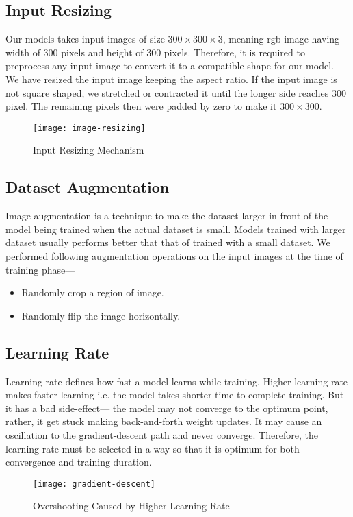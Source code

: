         \subsection{Input Resizing}
            Our models takes input images of size $300\times 300\times 3$, meaning \acrshort{rgb} image having width of 300 pixels and height of 300 pixels. Therefore, it is required to preprocess any input image to convert it to a compatible shape for our model.
            We have resized the input image keeping the aspect ratio. If the input image is not square shaped, we stretched or contracted it until the longer side reaches 300 pixel. The remaining pixels then were padded by zero to make it $300\times 300$. 
            \begin{figure}[h]
                \centering
                \texttt{[image: image-resizing]}
                \caption{Input Resizing Mechanism}
                \label{fig:img_resize}
            \end{figure}          
            
        \subsection{Dataset Augmentation}
            Image augmentation is a technique to make the dataset larger in front of the model being trained when the actual dataset is small. Models trained with larger dataset usually performs better that that of trained with a small dataset.            
            We performed following augmentation operations on the input images at the time of training phase---
            
            \begin{itemize}
                \item Randomly crop a region of image.
                \item Randomly flip the image horizontally.
            \end{itemize}
            
        \subsection{Learning Rate}
            Learning rate defines how fast a model learns while training. Higher learning rate makes faster learning i.e. the model takes shorter time to complete training. But it has a bad side-effect--- the model may not converge to the optimum point, rather, it get stuck making back-and-forth weight updates. It may cause an oscillation to the gradient-descent path and never converge. Therefore, the learning rate must be selected in a way so that it is optimum for both convergence and training duration.
            \begin{figure}[h]
                \centering
                \texttt{[image: gradient-descent]}
                \caption{Overshooting Caused by Higher Learning Rate}
                \label{fig:gradient_descent}
            \end{figure}
            
